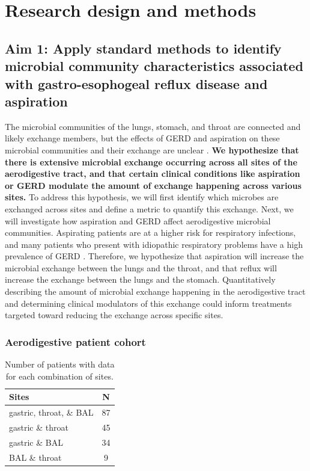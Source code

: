 \documentclass[12pt]{article}
\begin{document}
\section{Research design and methods}

\subsection{Aim 1: Apply standard methods to identify microbial community characteristics associated with gastro-esophogeal reflux disease and aspiration}

The microbial communities of the lungs, stomach, and throat
are connected and likely exchange members, but the effects of GERD and aspiration 
on these microbial communities and their exchange are unclear \cite{bassis-source-2015}.
\textbf{We hypothesize that there is extensive microbial exchange occurring
across all sites of the aerodigestive tract, and that certain clinical conditions like aspiration
or GERD modulate the amount of exchange happening across various sites.}
To address this hypothesis, we will first identify which microbes
are exchanged across sites and define a metric to quantify this exchange. 
Next, we will investigate how aspiration and GERD affect aerodigestive microbial communities.
Aspirating patients are at a higher risk for respiratory
infections, and many patients who present with idiopathic
respiratory problems have a high prevalence of GERD \cite{houghton-microaspiration-2016,  debenedictis-asp_dis-2009}. 
Therefore, we hypothesize that aspiration will increase the microbial exchange between the lungs and the throat,
and that reflux will increase the exchange between the lungs and the stomach.
Quantitatively describing the amount of microbial exchange happening in the
aerodigestive tract and determining clinical modulators of this exchange
could inform treatments targeted toward reducing the exchange across specific sites.

\subsubsection{Aerodigestive patient cohort}

\begin{table}
\begin{tabular}{l c}
	\hline
	\textbf{Sites} & \textbf{N} \\
	\hline
	gastric, throat, \& BAL & 87 \\
	gastric \& throat & 45 \\
	gastric \& BAL & 34 \\
	BAL \& throat & 9 \\
	\hline 
\end{tabular}
\caption{Number of patients with data for each combination of sites.}\label{tab:rosen_samples}
\end{table}
\end{document}
